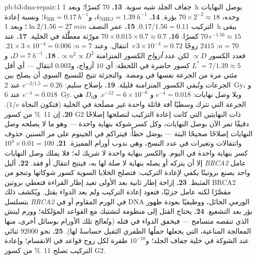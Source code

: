 \begin{solution}{pb:b3:dna-repair:1}
جفاف الجلد شبه سوية.
\textbf{13.} $70$ كسرًا؛ وبعد \qty{1}{h} بوصل النهايات وحده، $70\times
2^{-2} \approx 18$ بؤرة.
\textbf{14.} $k_{\text{NHEJ}} = \qty{1.39}{h^{-1}}$، و$k_{\text{HR}} =
\qty{0.17}{h^{-1}}$؛ ونسبة إعادة التركيب $0.17/1.56 = 0.11$.
\textbf{15.} عمر النصف $\ln 2/1.56 = \qty{27}{min}$؛ وبعد \qty{1}{h}
يبقى $70\,e^{-1.56} \approx 15$ كسرًا.
\textbf{16.} $70\times 0.015\times 0.7 \approx 0.7$ مورّثة معطَّلة في
الخلية.
\textbf{17.} عند $n = 70$: $2415$ زوجًا $\times 3\times 10^{-4} = 0.72$
انتقال. وعند $n = 7$: $21\times 3\times 10^{-4} = 0.006$. فعدد الكسور
$\propto D$ لكن عدد \emph{أزواج} الكسور المتزامنة
$\propto n^{2} \propto D^{2}$.
\textbf{18.} $D = \qty{7}{h^{-1}}$، و$L^{*} = 7/1.39 \approx 5$ كسور
حاضرة في اللحظة: أي $10$ أزواج، و$0.003$ انتقال --- أي أقل مئتي مرة
من الجرعة نفسها في ومضة. والتجزئة تتيح للنسيج السوي أن يصلح بين
الجرعات وتُبقي الكسور المتزامنة قليلة.
\textbf{19.} بإصلاح سليم: $e^{-2/1.5} = 0.26$ عند \qty{2}{Gy}،
و$e^{-4} = 0.018$ عند \qty{6}{Gy}. وبلا وصل نهايات: $e^{-4} = 0.018$ و
$e^{-12} = 6\times 10^{-6}$. و$D_{0}$ هي الجرعة التي تترك وسطيًا
آفة قاتلة واحدة غير مصلَحة في الخلية (فتكون النجاة $1/e$).
\textbf{20.} إن \qty{11}{\%} من كسور G2 ذات النهايتين التي كانت إعادة
التركيب لتصلحها إصلاحًا دقيقًا تمر الآن بوصل النهايات، وكل كسر شوكة
بنهاية واحدة --- وهو ما لا يصلحه وصل النهايات إصلاحًا صحيحًا
البتة --- يوصَل خطأً: فيتراكم في الجينوم على مر السنين حذوف
وانتقالات وتغيرات في عدد النسخ، وهي ندوب أورام \emph{}
المميزة.
\textbf{21.} $10^{4}\times 0.01 = 100$ كسر بنهاية واحدة في اليوم.
والكسر بنهاية واحدة لا شريك له؛ فلا يملك وصل النهايات إلا أن
يتركه أو يصله بنهاية لا صلة لها به، فينتج انتقال أو فقد.
\textbf{22.} أليل \emph{BRCA2} عامل واحد يصنع بروتينًا يكفي
لإعادة التركيب: فتصلح الخلايا السوية كسور شوكاتها وتنجو من
المثبط.
\textbf{23.} إزاحة إطار ثانية بعد الأولى تعيد إطار
القراءة فتعطي بروتين BRCA2 مقصَّرًا لكنه عامل جزئيًا، فتعود
إعادة التركيب ولم يعد الدواء يقتل. ويُكشف ذلك بتسلسل
\emph{BRCA2} في الورم المقاوم أو في DNA الورمي الجائل،
ووظيفيًا بعودة ظهور بؤر  بعد التشعيع.
\textbf{24.} يحتاج القتل إلى منظومة  لتشتبك مع
القواعد المؤلكلة؛ وورم لينش الذي تنقصه متسامح --- فيخفق الدواء في
قتله (وتُعالج تلك الأورام بوسائل أخرى، منها المعالجة المناعية،
التي يجعلها حملُها الطفري الثقيل حساسةً لها).
\textbf{25.} نحو \num{92000} ثنائي عند الشوكة في خلية جفاف الجلد؛
و$10^{-10}$ طفرة لكل زوج قواعد في الانقسام؛ وإعادة التركيب تصلح
\qty{11}{\%} من كسور G2.
\end{solution}

